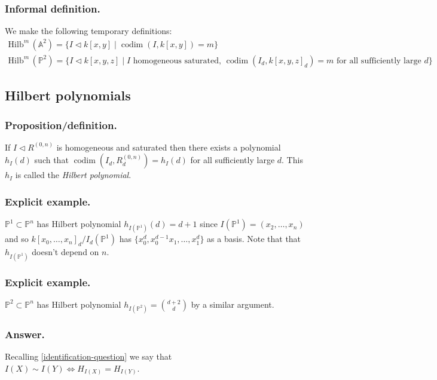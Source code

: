\documentclass[10pt]{article}
\numberwithin{equation}{subsubsection}
\DeclareMathOperator{\codim}{codim}
\renewcommand{\P}{\mathbb{P}}
\newcommand{\A}{\mathbb{A}}
\newcommand{\Hilb}[1]{\mathrm{Hilb}^{#1}\,}
\begin{document}
            \subsubsection{Informal definition.} We make the following temporary definitions:
                \begin{gather*}
                    \Hilb{m}(\A^2)=\{I\triangleleft k[x,y] \mid \codim(I,k[x,y])=m\}\\
                    \Hilb{m}(\P^2)=\{I\triangleleft k[x,y,z] \mid I\text{ homogeneous saturated, }\codim(I_d,k[x,y,z]_d)=m\text{ for all sufficiently large }d\}                    
                \end{gather*}
        
        \subsection{Hilbert polynomials}
        
            \subsubsection{Proposition/definition.} If $I\triangleleft R^{(0,n)}$ is homogeneous and saturated then there exists a polynomial $h_I(d)$ such that $\codim(I_d,R^{(0,n)}_d)=h_I(d)$ for all sufficiently large $d$. This $h_I$ is called the \textit{Hilbert polynomial}.
            
            \subsubsection{Explicit example.} $\P^1\subset\P^n$ has Hilbert polynomial $h_{I(\P^1)}(d)=d+1$ since $I(\P^1)=(x_2,\ldots,x_n)$ and so $k[x_0,\ldots,x_n]_d/I_d(\P^1)$ has $\{x_0^d,x_0^{d-1}x_1,\ldots,x_1^d\}$ as a basis. Note that that $h_{I(\P^1)}$ doesn't depend on $n$.
            
            \subsubsection{Explicit example.} $\P^2\subset\P^n$ has Hilbert polynomial $h_{I(\P^2)}=\binom{d+2}{d}$ by a similar argument.
            
            \subsubsection{Answer.} Recalling \ref{identification-question} we say that $I(X)\sim I(Y)\iff H_{I(X)}=H_{I(Y)}$.
            
\end{document}
